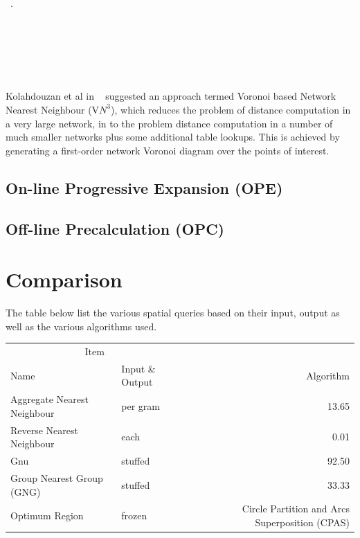 \documentclass[a4paper,11pt]{article}
\begin{document}
~\cite{safar2009voronoi}.

~\cite{sibson1981brief}

~\cite{taniar2011spatial}

~\cite{deng2007multi}

Kolahdouzan et al in ~\cite{kolahdouzan2004voronoi} suggested an approach termed Voronoi based Network Nearest Neighbour (V$N^3$), which reduces the problem of distance computation in a very large network, in to the problem distance computation in a number of much smaller networks plus some additional table lookups. This is achieved by generating a first-order network Voronoi diagram over the points of interest.

\subsection{On-line Progressive Expansion (OPE)}

\subsection{Off-line Precalculation (OPC)}

\section{Comparison}

The table below list the various spatial queries based on their input, output as well as the various algorithms used.

\begin{tabular}{llr}
\hline
\multicolumn{2}{c}{Item} \\
\cline{1-2}
Name    & Input \& Output & Algorithm \\
\hline
Aggregate Nearest Neighbour      & per gram    & 13.65      \\
Reverse Nearest Neighbour          & each        & 0.01       \\
Gnu       & stuffed     & 92.50      \\
Group Nearest Group (GNG)       & stuffed     & 33.33      \\
Optimum Region & frozen      & Circle Partition and Arcs Superposition (CPAS)       \\
\hline
\end{tabular}



\clearpage


\end{document}
